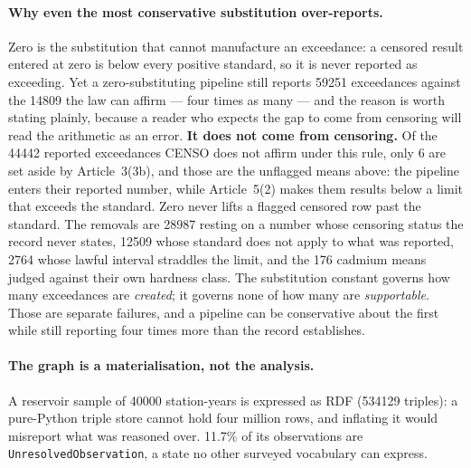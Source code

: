 \paragraph{Why even the most conservative substitution over-reports.}
Zero is the substitution that cannot manufacture an exceedance: a censored
result entered at zero is below every positive standard, so it is never
reported as exceeding. Yet a zero-substituting pipeline still reports
\num{59251} exceedances against the \num{14809} the law can affirm --- four
times as many --- and the reason is worth stating plainly, because a
reader who expects the gap to come from censoring will read the arithmetic as
an error. \textbf{It does not come from censoring.} Of the \num{44442}
reported exceedances CENSO does not affirm under this rule, only \num{6} are
set aside by Article~3(3b), and those are the unflagged means above: the
pipeline enters their reported number, while Article~5(2) makes them results
below a limit that exceeds the standard. Zero never lifts a flagged censored row
past the standard. The removals are \num{28987} resting on a number whose
censoring status the record never states, \num{12509} whose standard does not
apply to what was reported, \num{2764} whose lawful interval straddles the limit,
and the \num{176} cadmium means judged against their own hardness class.
The substitution constant governs how many exceedances are \emph{created}; it
governs none of how many are \emph{supportable}. Those are separate failures,
and a pipeline can be conservative about the first while still reporting four
times more than the record establishes.

\paragraph{The graph is a materialisation, not the analysis.}
A reservoir sample of \num{40000} station-years is expressed as RDF
(\num{534129} triples): a pure-Python triple store cannot hold four million
rows, and inflating it would misreport what was reasoned over. \num{11.7}\% of
its observations are \texttt{UnresolvedObservation}, a state no other surveyed
vocabulary can express.

